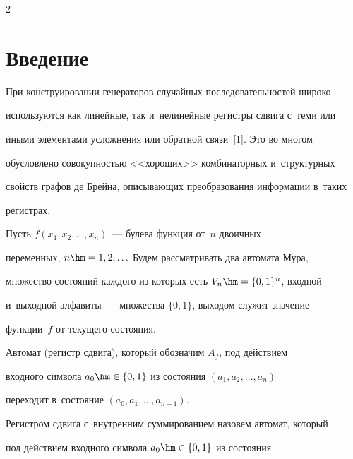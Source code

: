 \begin{multicols}{2}





\label{st\stat}


  


   


\section{Введение}





  При конструировании генераторов случайных последовательностей широко 


используются как линейные, так и~нелинейные регистры сдвига с~теми или 


иными элементами усложнения или обратной связи~[1]. Это во многом 


обусловлено совокупностью <<хороших>> комбинаторных и~структурных 


свойств графов де Брейна, описывающих преобразования информации в~таких 


регистрах.


  


  Пусть $f(x_1,x_2,\ldots , x_n)$~--- булева функция от~$n$ двоичных 


переменных, $n\hm= 1,2,\ldots$ Будем рас\-смат\-ри\-вать два автомата Мура, 


множество состояний каждого из которых есть $V_n\hm= \{0,1\}^n$, входной 


и~выходной алфавиты~--- множества $\{0,1\}$, выходом служит значение 


функции~$f$ от текущего состояния. 


  


  Автомат (регистр сдвига), который обозначим $A_f$, под действием 


входного символа $a_0\hm\in \{0,1\}$ из состояния $(a_1, a_2, \ldots ,a_n)$ 


переходит в~состояние $(a_0, a_1, \ldots , a_{n-1})$.


   


  Регистром сдвига с~внутренним суммированием назовем автомат, который 


под действием входного символа $a_0\hm\in \{0,1\}$ из состояния 



\end{multicols}
